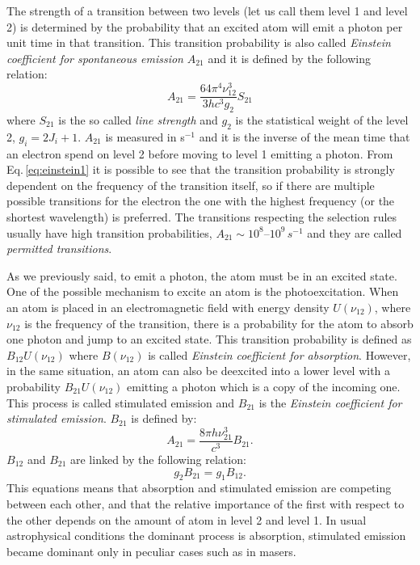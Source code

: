 \documentclass[../main.tex]{subfiles}
\begin{document}
The strength of a transition between two levels (let us call them level 1 and level 2) is determined by the probability that an excited atom will emit a photon per unit time in that transition.
This transition probability is also called \emph{Einstein coefficient for spontaneous emission} $A_{21}$ and it is defined by the following relation:
\begin{equation}
    \label{eq:einstein1}
    A_{21} = \frac{64\pi^{4}\nu_{12}^3}{3hc^3g_2}S_{21}
\end{equation}
where $S_{21}$ is the so called \emph{line strength} and $g_2$ is the statistical weight of the level 2, $g_i = 2J_i+1$.
$A_{21}$ is measured in s$^{-1}$ and it is the inverse of the mean time that an electron spend on level 2 before moving to level 1 emitting a photon.
From Eq.\,\ref{eq:einstein1} it is possible to see that the transition probability is strongly dependent on the frequency of the transition itself, so if there are multiple possible transitions for the electron the one with the highest frequency (or the shortest wavelength) is preferred.
The transitions respecting the selection rules usually have high transition probabilities, $A_{21}\sim 10^8$--$10^9\,\si{s^{-1}}$ and they are called \emph{permitted transitions}.

As we previously said, to emit a photon, the atom must be in an excited state.
One of the possible mechanism to excite an atom is the photoexcitation.
When an atom is placed in an electromagnetic field with energy density $U(\nu_{12})$, where $\nu_{12}$ is the frequency of the transition, there is a probability for the atom to absorb one photon and jump to an excited state.
This transition probability is defined as $B_{12}U(\nu_{12})$ where $B(\nu_{12})$ is called \emph{Einstein coefficient for absorption}.
However, in the same situation, an atom can also be deexcited into a lower level with a probability $B_{21}U(\nu_{12})$ emitting a photon which is a copy of the incoming one.
This process is called stimulated emission and $B_{21}$ is the \emph{Einstein coefficient for stimulated emission}.
$B_{21}$ is defined by:
\begin{equation}
    \label{eq:einstein2}
    A_{21} = \frac{8\pi h\nu_{21}^3}{c^3} B_{21}.
\end{equation}
$B_{12}$ and $B_{21}$ are linked by the following relation:
\begin{equation}
    \label{eq:einstein3}
    g_2B_{21} = g_1B_{12}.
\end{equation}
This equations means that absorption and stimulated emission are competing between each other, and that the relative importance of the first with respect to the other depends on the amount of atom in level 2 and level 1.
In usual astrophysical conditions the dominant process is absorption, stimulated emission became dominant only in peculiar cases such as in masers. 
\end{document}
